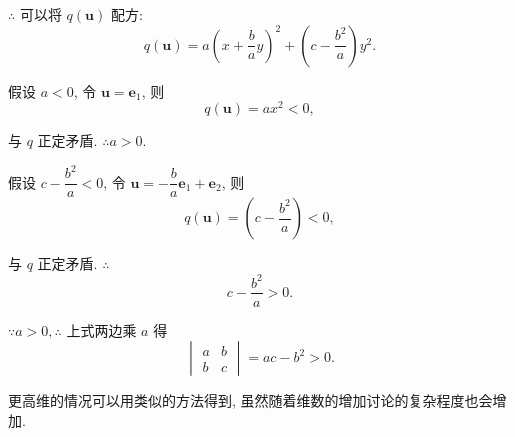 \documentclass[color=black,device=normal,lang=cn,mode=geye]{elegantnote}
\begin{document}
$\therefore$ 可以将 $q(\boldsymbol{u})$ 配方:
\begin{equation}\label{eq3.2}
    q(\boldsymbol{u})=a\left(x+\dfrac{b}{a}y\right)^2+\left(c-\dfrac{b^2}{a}\right)y^2.
\end{equation}

假设 $a<0$, 令 $\boldsymbol{u}=\boldsymbol{e}_1$, 则
\[q(\boldsymbol{u})=ax^2<0,\]

与 $q$ 正定矛盾. $\therefore a>0$.

假设 $c-\dfrac{b^2}{a}<0$, 令 $\boldsymbol{u}=-\dfrac{b}{a}\boldsymbol{e}_1+\boldsymbol{e}_2$, 则
\[q(\boldsymbol{u})=\left(c-\dfrac{b^2}{a}\right)<0,\]

与 $q$ 正定矛盾. $\therefore$
\[c-\dfrac{b^2}{a}>0.\]

$\because a>0,\therefore$ 上式两边乘 $a$ 得
\[\begin{vmatrix}
    a & b \\
    b & c
\end{vmatrix}=ac-b^2>0.\]

更高维的情况可以用类似的方法得到, 虽然随着维数的增加讨论的复杂程度也会增加.
\end{document}
